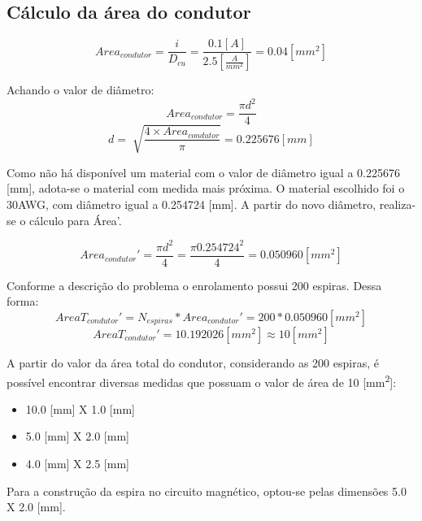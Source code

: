 \subsection{Cálculo da área do condutor}
\begin{equation}
Area_{condutor} = \frac{i}{D_{cu}} = \frac{0.1 [A]}{2.5 [\frac{A}{mm^2}]} = 0.04 [mm^2]
\end{equation}

Achando o valor de diâmetro:
\begin{equation}
Area_{condutor} = \frac{\pi d^2}{4}
\end{equation}
\begin{equation}
d = \sqrt[]{\frac{4 \times Area_{condutor}}{\pi}} = 0.225676 [mm]
\end{equation}

Como não há disponível um material com o valor de diâmetro igual a 0.225676 [mm], adota-se o material com medida mais próxima. O material escolhido foi o 30AWG, com diâmetro igual a 0.254724 [mm]. A partir do novo diâmetro, realiza-se o cálculo para Área'.

\begin{equation}
Area_{condutor}' = \frac{\pi d^2}{4} = \frac{\pi 0.254724^2}{4} = 0.050960 [mm^2]
\end{equation}

Conforme a descrição do problema o enrolamento possui 200 espiras. Dessa forma:
\begin{equation}
AreaT_{condutor}' = N_{espiras} * Area_{condutor}' = 200 * 0.050960 [mm^2]
\end{equation}
\begin{equation}
AreaT_{condutor}' =  10.192026 [mm^2] \approx 10 [mm^2]
\end{equation}

A partir do valor da área total do condutor, considerando as 200 espiras, é possível encontrar diversas medidas que possuam o valor de área de 10 [mm\textsuperscript{2}]:
\begin{itemize}
\item 10.0 [mm] X 1.0 [mm]
\item  5.0 [mm] X 2.0 [mm]
\item  4.0 [mm] X 2.5 [mm]
\end{itemize}
Para a construção da espira no circuito magnético, optou-se pelas dimensões 5.0 X 2.0 [mm].

